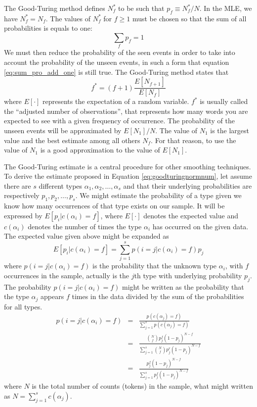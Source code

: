 The Good-Turing method \citep{Good1953} defines $N_f^\ast$ to be such that $p_f \equiv N_f^\ast / N$.
In the MLE, we have $N_f^\ast = N_f$. The values of $N_f^\ast$ for $f \geq 1$ must
be chosen so that the sum of all probabilities is equals to one: 
\begin{equation}
\label{eq:sum_pro_add_one}
\sum_f p_f = 1
\end{equation}
We must then reduce the probability of the seen events in order to take into account
the probability of the unseen events, in such a form that equation \ref{eq:sum_pro_add_one}
is still true. The Good-Turing method states that
\begin{equation}
\label{eq:goodturingnormnum}
f^\ast = (f + 1) \frac{E[N_{f+1}]}{E[N_f]}
\end{equation}
where $E[\cdot]$ represents the expectation of a random variable.
$f^\ast$ is usually called the ``adjusted number of observations'', that
represents how many words you are expected to see with a given frequency of occurrence.
The probability of the unseen events will be approximated by $E[N_1]/N$.
The value of $N_1$ is the largest value and the best estimate among all others $N_f$.
For that reason, to use the value of $N_1$ is a good approximation to the value of $E[N_1]$.


The Good-Turing estimate is a central procedure for other smoothing techniques. To derive the
estimate proposed in Equation \ref{eq:goodturingnormnum}, let assume there are $s$ different types
$\alpha_1, \alpha_2, \ldots, \alpha_s$ and that their underlying probabilities are respectively
$p_1, p_2, \ldots, p_s$.  We might estimate the probability of a type given we know how many
occurrences of that type exists on our sample. It will be expressed by $E[p_i | c(\alpha_i) = f]$,
where $E[\cdot]$ denotes the expected value and $c(\alpha_i)$ denotes the number of times the
type $\alpha_i$ has occurred on the given data. The expected value given above might
be expanded as
\begin{equation}
\label{eq:Epicif}
E[p_i | c(\alpha_i) = f] = \sum_{j=1}^{s} p(i=j | c(\alpha_i) = f) p_j
\end{equation}
where $p(i=j | c(\alpha_i) = f)$ is the probability that the unknown type $\alpha_i$, with $f$ occurrences
in the sample, actually is the $j$th type with underlying probability $p_j$. The probability
$p(i=j | c(\alpha_i) = f)$ might be written as the probability that the type $\alpha_j$ appears $f$
times in the data divided by the sum of the probabilities for all types.
\begin{eqnarray}
\label{eq:pijcif}
p(i=j | c(\alpha_i) = f) &=& \frac{p(c(\alpha_j) = f)}{\sum_{j=1}^{s} p(c(\alpha_j) = f)} \nonumber \\
         &=& \frac{ {N \choose f} p_j^f (1-p_j)^{N-f} }{ \sum_{j=1}^{s} {N \choose f} p_j^r (1-p_j)^{N-f} }  \nonumber \\
         &=& \frac{ p_j^f (1-p_j)^{N-f} }{ \sum_{j=1}^{s} p_j^f (1-p_j)^{N-f} }
\end{eqnarray}
where $N$ is the total number of counts (tokens) in the sample, what might written as $N = \sum_{j=1}^{s} c(\alpha_j)$.

